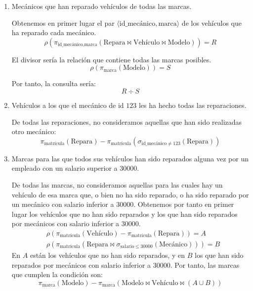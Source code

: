 \begin{ejercicio}
\begin{enumerate}
        \item Mecánicos que han reparado vehículos de todas las marcas.
        
        Obtenemos en primer lugar el par $\langle \text{id\_mecánico}, \text{marca} \rangle$ de los vehículos que ha reparado cada mecánico.
        \begin{equation*}
            \rho\left(\pi_{\text{id\_mecánico},\text{marca}}(\text{Repara}\bowtie \text{Vehículo}\bowtie \text{Modelo})\right) = R
        \end{equation*}

        El divisor sería la relación que contiene todas las marcas posibles.
        \begin{equation*}
            \rho(\pi_{\text{marca}}(\text{Modelo})) = S
        \end{equation*}

        Por tanto, la consulta sería:
        \begin{equation*}
            R \div S
        \end{equation*}

        \item Vehículos a los que el mecánico de id $123$ les ha hecho todas las reparaciones.
        
        De todas las reparaciones, no consideramos aquellas que han sido realizadas otro mecánico:
        \begin{equation*}
            \pi_{\text{matrícula}}(\text{Repara}) - \pi_{\text{matrícula}}(\sigma_{\text{id\_mecánico} \neq 123}(\text{Repara}))
        \end{equation*}
        \item Marcas para las que todos sus vehículos han sido reparados alguna vez por un empleado con un salario superior a $30000$.
        
        De todas las marcas, no consideramos aquellas para las cuales hay un vehículo de
        esa marca que, o bien no ha sido reparado, o ha sido reparado por un mecánico con salario inferior a $30000$.
        Obtenemos por tanto en primer lugar los
        vehículos que no han sido reparados y los que han sido reparados por mecánicos con salario inferior a $30000$.
        \begin{align*}
            &\rho(\pi_{\text{matrícula}}(\text{Vehículo}) - \pi_{\text{matrícula}}(\text{Repara})) = A\\
            &\rho(\pi_{\text{matrícula}}(\text{Repara} \bowtie \sigma_{\text{salario} \leq 30000}(\text{Mecánico}))) = B
        \end{align*}
        En $A$ están los vehículos que no han sido reparados, y en $B$ los que han sido reparados por mecánicos con salario inferior a $30000$.
        Por tanto, las marcas que cumplen la condición son:
        \begin{equation*}
            \pi_{\text{marca}}(\text{Modelo}) - \pi_{\text{marca}}(\text{Modelo}\bowtie \text{Vehículo}\bowtie (A \cup B))
        \end{equation*}


\end{enumerate}
\end{ejercicio}
